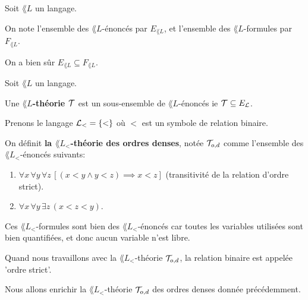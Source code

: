 \documentclass[a4paper, 12pt]{report}
\begin{document}
\begin{notation} 
	Soit $\lang{L}$ un langage.

	On note l'ensemble des $\lang{L}$-énoncés par $E_{\lang{L}}$, et l'ensemble
	des $\lang{L}$-formules par $F_{\lang{L}}$.

	On a bien sûr $E_{\lang{L}} \subseteq F_{\lang{L}}$.
\end{notation}

\begin{definition} 
	Soit $\lang{L}$ un langage.

	Une \textbf{$\lang{L}$-théorie $\mathcal{T}$} est un sous-ensemble de
	$\lang{L}$-énoncés ie $\mathcal{T} \subseteq E_{\mathcal{L}}$.
\end{definition}

\begin{exemple} 
	Prenons le langage $\mathcal{L}_{<} = \left\{ < \right\}$ où $<$ est un symbole de relation
	binaire.

	On définit \textbf{la $\lang{L}_{<}$-théorie des ordres denses}, notée
	$\mathcal{T}_{o, d}$ comme l'ensemble des $\lang{L}_{<}$-énoncés suivants:

	\begin{enumerate}
		\item $\forall x \, \forall y \, \forall z \, [(x < y \wedge y < z)
			\implies x < z]$ (transitivité de la relation d'ordre strict).
		\item $\forall x \, \forall y \, \exists z \, (x < z < y)$.
	\end{enumerate}

	Ces $\lang{L}_{<}$-formules sont bien des $\lang{L}_{<}$-énoncés car toutes les
	variables utilisées sont bien quantifiées, et donc aucun variable n'est libre.

	Quand nous travaillons avec la $\lang{L}_{<}$-théorie $\mathcal{T}_{o, d}$, la
	relation binaire est appelée 'ordre strict'.
\end{exemple}

Nous allons enrichir la $\lang{L}_{<}$-théorie $\mathcal{T}_{o, d}$ des ordres
denses donnée précédemment.
\end{document}
